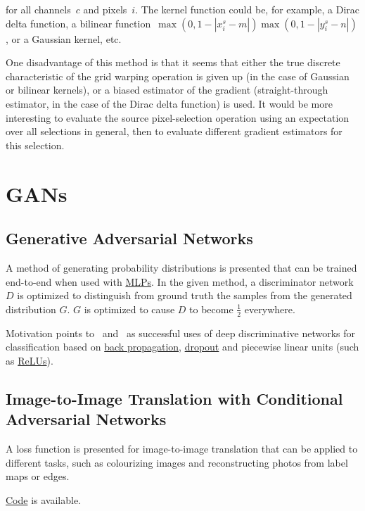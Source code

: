 \documentclass[a4paper, 12pt]{article}
\begin{document}
for all channels~$c$ and pixels~$i$. The kernel function could be, for example,
a Dirac delta function, a bilinear
function~$\max(0, 1 - |x_i^s - m|)\max(0, 1 - |y_i^s - n|)$, or a Gaussian
kernel, etc.

One disadvantage of this method is that it seems that either the true discrete
characteristic of the grid warping operation is given up (in the case of
Gaussian or bilinear kernels), or a biased estimator of the gradient
(straight-through estimator, in the case of the Dirac delta function) is used.
It would be more interesting to evaluate the source pixel-selection operation
using an expectation over all selections in general, then to evaluate different
gradient estimators for this selection.


\section{GANs}


\subsection{Generative Adversarial Networks\citet{NIPS2014_5423}}
\label{gan}

A method of generating probability distributions is presented that can be
trained end-to-end when used with \hyperref[multilayer_perceptron]{MLPs}. In
the given method, a discriminator network $D$ is optimized to distinguish from
ground truth the samples from the generated distribution $G$. $G$ is optimized
to cause $D$ to become $\frac{1}{2}$ everywhere.

Motivation points to~\citet{deepSpeechReviewSPM2012} and~\citet{NIPS2012_4824} as
successful uses of deep discriminative networks for classification based on
\hyperref[backprop]{back propagation}, \hyperref[dropout]{dropout} and
piecewise linear units (such as \hyperref[rectified_linear_units]{ReLUs}).


\subsection{Image-to-Image Translation with Conditional Adversarial
            Networks\citet{DBLP:journals/corr/IsolaZZE16}}

A loss function is presented for image-to-image translation that can be applied
to different tasks, such as colourizing images and reconstructing photos from
label maps or edges.

\href{https://github.com/phillipi/pix2pix}{Code} is available.
\end{document}
